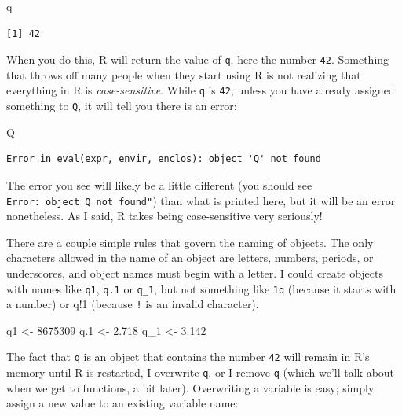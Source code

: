 \documentclass[
  letterpaper,
]{book}
\newenvironment{Shaded}{\begin{snugshade}}{\end{snugshade}}
\newcommand{\DecValTok}[1]{\textcolor[rgb]{0.68,0.00,0.00}{#1}}
\newcommand{\FloatTok}[1]{\textcolor[rgb]{0.68,0.00,0.00}{#1}}
\newcommand{\NormalTok}[1]{\textcolor[rgb]{0.00,0.23,0.31}{#1}}
\newcommand{\OtherTok}[1]{\textcolor[rgb]{0.00,0.23,0.31}{#1}}
\begin{document}
\begin{Shaded}
\begin{Highlighting}[]
\NormalTok{q}
\end{Highlighting}
\end{Shaded}

\begin{verbatim}
[1] 42
\end{verbatim}

When you do this, R will return the value of \texttt{q}, here the number
\texttt{42}. Something that throws off many people when they start using
R is not realizing that everything in R is \emph{case-sensitive}. While
\texttt{q} is \texttt{42}, unless you have already assigned something to
\texttt{Q}, it will tell you there is an error:

\begin{Shaded}
\begin{Highlighting}[]
\NormalTok{Q}
\end{Highlighting}
\end{Shaded}

\begin{verbatim}
Error in eval(expr, envir, enclos): object 'Q' not found
\end{verbatim}

The error you see will likely be a little different (you should see
\texttt{Error:\ object\ \textquotesingle{}Q\textquotesingle{}\ not\ found"})
than what is printed here, but it will be an error nonetheless. As I
said, R takes being case-sensitive very seriously!

There are a couple simple rules that govern the naming of objects. The
only characters allowed in the name of an object are letters, numbers,
periods, or underscores, and object names must begin with a letter. I
could create objects with names like \texttt{q1}, \texttt{q.1} or
\texttt{q\_1}, but not something like \texttt{1q} (because it starts
with a number) or q!1 (because \texttt{!} is an invalid character).

\begin{Shaded}
\begin{Highlighting}[]
\NormalTok{q1 }\OtherTok{\textless{}{-}} \DecValTok{8675309}
\NormalTok{q}\FloatTok{.1} \OtherTok{\textless{}{-}} \FloatTok{2.718}
\NormalTok{q\_1 }\OtherTok{\textless{}{-}} \FloatTok{3.142}
\end{Highlighting}
\end{Shaded}

The fact that \texttt{q} is an object that contains the number
\texttt{42} will remain in R's memory until R is restarted, I overwrite
\texttt{q}, or I remove \texttt{q} (which we'll talk about when we get
to functions, a bit later). Overwriting a variable is easy; simply
assign a new value to an existing variable name:
\end{document}
